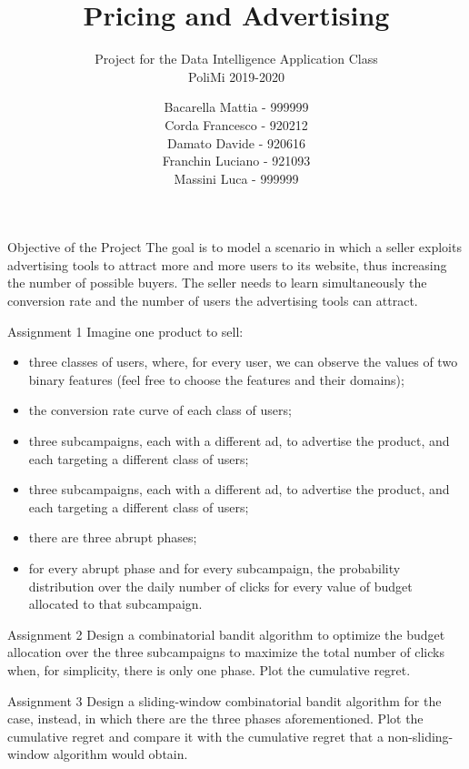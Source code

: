 \documentclass[11pt]{beamer}
\author{Bacarella Mattia - 999999\\
		Corda Francesco - 920212\\
		Damato Davide - 920616\\
		Franchin Luciano - 921093\\
		Massini Luca - 999999}
\title{Pricing and Advertising}
\subtitle{Project for the Data Intelligence Application Class\\
		PoliMi 2019-2020}
\begin{document}
\begin{frame}
\titlepage
\end{frame}


\begin{frame}{Objective of the Project}
The goal is to model a scenario in which a seller exploits advertising tools to attract more and more users to its website, thus increasing the number of possible buyers. The seller needs to learn simultaneously the conversion rate and the number of users the advertising tools can attract.
\end{frame}

\begin{frame}{Assignment 1}
Imagine one product to sell:
\begin{itemize}
\item three classes of users, where, for every user, we can observe the values of two binary features (feel free to choose the features and their domains);
\item the conversion rate curve of each class of users;
\item three subcampaigns, each with a different ad, to advertise the product, and each targeting a different class of users;
\item three subcampaigns, each with a different ad, to advertise the product, and each targeting a different class of users;
\item there are three abrupt phases;
\item for every abrupt phase and for every subcampaign, the probability distribution over the daily number of clicks for every value of budget allocated to that subcampaign.
\end{itemize}
\end{frame}

\begin{frame}{Assignment 2}
Design a combinatorial bandit algorithm to optimize the budget allocation over the three subcampaigns to maximize the total number of clicks when, for simplicity, there is only one phase. Plot the cumulative regret.
\end{frame}

\begin{frame}{Assignment 3}
Design a sliding-window combinatorial bandit algorithm for the case, instead, in which there are the three phases aforementioned. Plot the cumulative regret and compare it with the cumulative regret that a non-sliding-window algorithm would obtain.
\end{frame}
\end{document}
